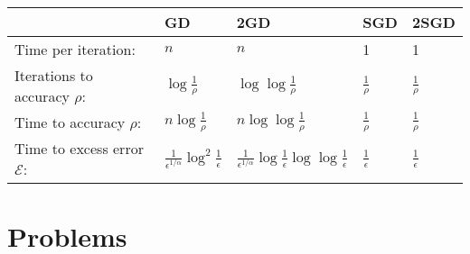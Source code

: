 \documentclass[10pt]{exam}
\theoremstyle{definition}
\newtheorem{problem}{Problem}
\newcommand{\ignore}[1]{}
\begin{document}
\vspace{0.15in}
\begin{center}
    \renewcommand*{\arraystretch}{3}
    \begin{tabular}{lC{1in}C{1in}C{1in}C{1in}}
    \toprule
    & GD & 2GD & SGD & 2SGD \\
    \midrule
    Time per iteration: & $n$ & $n$ & 1 & 1 \\
    Iterations to accuracy $\rho$: & $\log\tfrac 1 \rho$ & $\log\log\tfrac 1 \rho$ & $\tfrac1\rho$  & $\tfrac1\rho$  \\
    Time to accuracy $\rho$: & $n\log\tfrac1\rho$ & $n\log\log\tfrac 1 \rho$ & $\tfrac 1\rho$ & $\tfrac 1\rho$ \\
    Time to excess error $\mathcal E$: & $\tfrac 1 {\epsilon^{1/\alpha}} \log^2 \tfrac 1\epsilon$ & $\tfrac1{\epsilon^{1/\alpha}}\log\tfrac 1 \epsilon \log\log \tfrac 1 \epsilon$ & $\tfrac 1 \epsilon$ & $\tfrac 1 \epsilon$ \\
    \bottomrule
\end{tabular}
\end{center}

\ignore{
\subsection*{Section 2.1, 2.2}
    Reproduce the update formulas for \emph{gradient descent} (GD) and \emph{stochastic gradient descent} (SGD) below.
    This is Equations (2-5) in the reference.

\subsection*{Section 3.1}

Equation (6) states that the excess error $\mathcal E = E(\tilde f_n) - E(f^*)$ can be decomposed in three terms:
\begin{align*}
    \mathcal E 
    & = \bigg(E(f^*_{\mathcal F}) - E(f^*)\bigg)
      + \bigg(E(f_n) - E(f^*_{\mathcal F})\bigg)
      + \bigg(E(\tilde f_n) - E(f_n)\bigg)
\end{align*}

\subsection*{Section 3.2}
}

\newpage
\section*{Problems}
\end{document}
